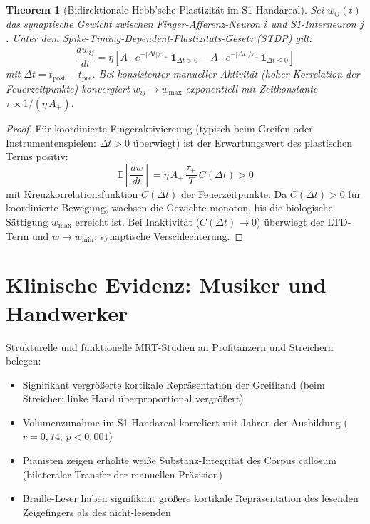 ﻿\documentclass[12pt,a4paper]{report}
\theoremstyle{plain}
\newtheorem{theorem}{Theorem}[section]
\theoremstyle{definition}
\theoremstyle{remark}
\begin{document}
\begin{theorem}[Bidirektionale Hebb'sche Plastizität im S1-Handareal]
\label{thm:stdp}
Sei $w_{ij}(t)$ das synaptische Gewicht zwischen Finger-Afferenz-Neuron $i$
und S1-Interneuron $j$. Unter dem Spike-Timing-Dependent-Plastizitäts-Gesetz
(STDP) gilt:
\[
  \frac{dw_{ij}}{dt} = \eta\left[
    A_+\, e^{-|\Delta t|/\tau_+}\, \mathbf{1}_{\Delta t > 0}
    - A_-\, e^{-|\Delta t|/\tau_-}\, \mathbf{1}_{\Delta t \leq 0}
  \right]
\]
mit $\Delta t = t_{\text{post}} - t_{\text{pre}}$. Bei konsistenter
manueller Aktivität (hoher Korrelation der Feuerzeitpunkte) konvergiert
$w_{ij} \to w_{\max}$ exponentiell mit Zeitkonstante $\tau \propto 1/(\eta\,A_+)$.
\end{theorem}

\begin{proof}
Für koordinierte Fingeraktiviereung (typisch beim Greifen oder
Instrumentenspielen: $\Delta t > 0$ überwiegt) ist der Erwartungswert
des plastischen Terms positiv:
\[
  \mathbb{E}\!\left[\frac{dw}{dt}\right]
  = \eta\,A_+\,\frac{\tau_+}{T}\, C(\Delta t) > 0
\]
mit Kreuzkorrelationsfunktion $C(\Delta t)$ der Feuerzeitpunkte.
Da $C(\Delta t) > 0$ für koordinierte Bewegung, wachsen die Gewichte
monoton, bis die biologische Sättigung $w_{\max}$ erreicht ist.
Bei Inaktivität ($C(\Delta t) \to 0$) überwiegt der LTD-Term
und $w \to w_{\min}$: synaptische Verschlechterung.
\end{proof}

\section{Klinische Evidenz: Musiker und Handwerker}

Strukturelle und funktionelle MRT-Studien an Profitänzern \cite{haenggi2010}
und Streichern \cite{elbert1995} belegen:

\begin{itemize}
\item Signifikant vergrößerte kortikale Repräsentation der Greifhand
  (beim Streicher: linke Hand überproportional vergrößert)
\item Volumenzunahme im S1-Handareal korreliert mit Jahren der
  Ausbildung ($r = 0{,}74$, $p < 0{,}001$)
\item Pianisten zeigen erhöhte weiße Substanz-Integrität des
  Corpus callosum (bilateraler Transfer der manuellen Präzision)
\item Braille-Leser haben signifikant größere kortikale Repräsentation
  des lesenden Zeigefingers als des nicht-lesenden
\end{itemize}
\end{document}
